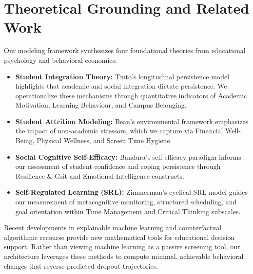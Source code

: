\documentclass[twocolumn,10pt,a4paper]{article}
\begin{document}
\FloatBarrier

\section{Theoretical Grounding and Related Work}
\label{sec:related}
Our modeling framework synthesizes four foundational theories from educational psychology and behavioral economics:
\begin{itemize}
    \item \textbf{Student Integration Theory:} Tinto's longitudinal persistence model \cite{tinto1975dropout, tinto1993leaving, hassan2024predicting} highlights that academic and social integration dictate persistence. We operationalize these mechanisms through quantitative indicators of Academic Motivation, Learning Behaviour, and Campus Belonging.
    \item \textbf{Student Attrition Modeling:} Bean's environmental framework \cite{bean1980dropouts} emphasizes the impact of non-academic stressors, which we capture via Financial Well-Being, Physical Wellness, and Screen Time Hygiene.
    \item \textbf{Social Cognitive Self-Efficacy:} Bandura's self-efficacy paradigm \cite{bandura1977self} informs our assessment of student confidence and coping persistence through Resilience \& Grit and Emotional Intelligence constructs.
    \item \textbf{Self-Regulated Learning (SRL):} Zimmerman's cyclical SRL model \cite{zimmerman2000attaining, molenaar2024towards, alharbi2024psychometric} guides our measurement of metacognitive monitoring, structured scheduling, and goal orientation within Time Management and Critical Thinking subscales.
\end{itemize}

Recent developments in explainable machine learning \cite{lundberg2017unified, ribeiro2016why, khosravi2023explainable, morris2024evaluating} and counterfactual algorithmic recourse \cite{wachter2017counterfactual, mothilal2020explaining, swamy2024evaluating, zhang2025counterfactual, rodriguez2024counterfactual} provide new mathematical tools for educational decision support. Rather than viewing machine learning as a passive screening tool, our architecture leverages these methods to compute minimal, achievable behavioral changes that reverse predicted dropout trajectories.
\end{document}
